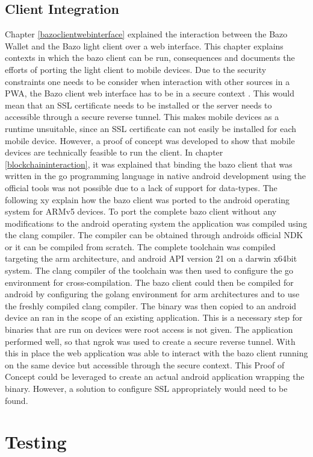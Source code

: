 \subsection{Client Integration}
Chapter \ref{bazoclientwebinterface} explained the interaction between the Bazo Wallet and the Bazo light client over a web interface.
This chapter explains contexts in which the bazo client can be run, consequences and documents the efforts of porting the light client to mobile devices.
Due to the security constraints one needs to be consider when interaction with other sources in a PWA, the Bazo client web interface has to be in a secure context \cite{securitychrome}. This would mean that an SSL certificate needs to be installed or the server needs to accessible through a secure reverse tunnel.
This makes mobile devices as a runtime unsuitable, since an SSL certificate can not easily be installed for each mobile device. However, a proof of concept was developed to show that mobile devices are technically feasible to run the client. In chapter \ref{blockchaininteraction}, it was explained that binding the bazo client that was written in the go programming language in native android development using the official tools was not possible due to a lack of support for data-types. The following xy explain how the bazo client was ported to the android operating system for ARMv5 devices.
To port the complete bazo client without any modifications to the android operating system the application was compiled  using the clang compiler. The compiler can be obtained through androids official NDK or it can be compiled from scratch. The complete toolchain was compiled targeting the arm architecture, and android API version 21 on a darwin x64bit system. The clang compiler of the toolchain was then used to configure the go environment for cross-compilation. The bazo client could then be compiled for android by configuring the golang environment for arm architectures and to use the freshly compiled clang compiler.
The binary was then copied to an android device an ran in the scope of an existing application. This is a necessary step for binaries that are run on devices were root access is not given. The application performed well, so that ngrok was used to create a secure reverse tunnel. With this in place the web application was able to interact with the bazo client running on the same device but accessible through the secure context.
This Proof of Concept could be leveraged to create an actual android application wrapping the binary. However, a solution to configure SSL appropriately would need to be found.

\section{Testing}

\newpage
